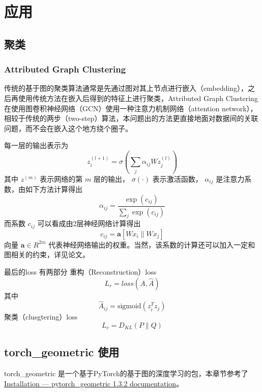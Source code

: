 \documentclass[color=gray,base=hide,cn]{elegantbook}
\begin{document}
\part{应用}
\chapter{聚类}
\section{Attributed Graph Clustering}
传统的基于图的聚类算法通常是先通过图对其上节点进行嵌入（embedding），之后再使用传统方法在嵌入后得到的特征上进行聚类，Attributed Graph Clustering\cite{wang2019attributed} 在使用图卷积神经网络（GCN）使用一种注意力机制网络（attention network），相较于传统的两步（two-step）算法，本问题出的方法更直接地面对数据间的关联问题，而不会在嵌入这个地方绕个圈子。

每一层的输出表示为
\begin{equation}
    z^{(l+1)}_i = \sigma(\sum_j \alpha_{ij} W z^{(l)}_j)
\end{equation}
其中 $z^{(m)}$ 表示网络的第 $m$ 层的输出， $\sigma(\cdot)$ 表示激活函数， $\alpha_{ij}$ 是注意力系数，由如下方法计算得出
\begin{equation}
    \alpha_{ij} = \frac{\exp (c_{ij})}{\sum_j \exp (c_{ij})}
\end{equation}
而系数 $c_{ij}$ 可以看成由2层神经网络计算得出
\begin{equation}
    c_{ij} = \mathbf{a} [W x_i\| W x_j]
\end{equation}
向量 $\mathbf{a} \in {R}^{2m}$ 代表神经网络输出的权重。当然，该系数的计算还可以加入一定和图相关的约束，详见论文。


最后的loss 有两部分
重构（Reconstruction）loss
\begin{equation}
    L_r = loss(A, \hat{A})
\end{equation}
其中
\begin{equation}
    \hat{A}_{ij} = \text{sigmoid} (z_i ^T z
_j)
\end{equation}
聚类（clusgtering）loss
\begin{equation}
    L_c = D_{KL}(P\|Q)
\end{equation}

% 


\appendix

\chapter{torch\_geometric 使用}
torch\_geometric 是一个基于PyTorch的基于图的深度学习的包，本章节参考了\href{https://pytorch-geometric.readthedocs.io/en/latest/notes/installation.html}{Installation — pytorch\_geometric 1.3.2 documentation}。
\end{document}
